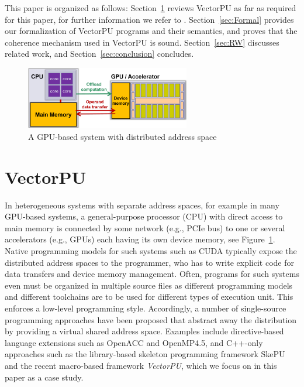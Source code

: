 This paper is organized as follows:
Section~\ref{VectorPU} reviews VectorPU as far as required for  this paper, for further information we refer to \cite{VectorPU-2017}.
Section~\ref{sec:Formal} provides our formalization of VectorPU programs and
their semantics, and proves that the coherence mechanism used in
VectorPU is sound. Section~\ref{sec:RW} discusses related work, and 
Section~\ref{sec:conclusion} concludes.

\begin{figure}
\begin{center}
\includegraphics[width=0.64\textwidth]{img/CPU-GPU.png}
\caption{\label{fig:CPU-GPU}A GPU-based system with distributed address space}
\end{center}
\end{figure}

\section{VectorPU}\label{VectorPU}

In heterogeneous systems with separate address spaces, for example in 
many GPU-based systems, a general-purpose processor
(CPU) with direct access to main memory is connected by some network
(e.g., PCIe bus) to one or several accelerators
(e.g., GPUs) each having its own device memory,
see Figure~\ref{fig:CPU-GPU}. Native programming models
for such systems such as CUDA typically expose the distributed address spaces to the programmer, who has to write explicit 
code for data transfers and device memory management.
Often, programs for such systems even must be organized in multiple source files
as different programming models and different toolchains
are to be used for different types of execution unit.
This enforces a low-level programming style. 
Accordingly, a number of single-source 
programming approaches have been proposed that abstract away the distribution 
by providing a virtual shared address space. Examples include directive-based
language extensions such as OpenACC and OpenMP4.5, and C++-only approaches 
such as the library-based skeleton programming framework SkePU \cite{Dastgeer-IJPP15}
and the recent macro-based framework \textit{VectorPU}, 
which we focus on in this paper as a case study.

